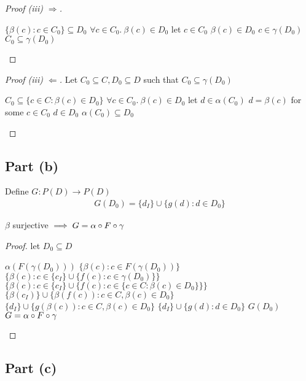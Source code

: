 \begin{prop}
\begin{proof}[Proof (iii) $\Rightarrow$]
    \begin{itemize}
      \step[\imps] $\{\beta(c) : c\in C_0\}\subseteq D_0$
      \step[\imps] $\forall c\in C_0.~\beta(c)\in D_0$
      \marginnote{($\star$)}
      \step let $c\in C_0$
      \step[\imps] $\beta(c)\in D_0$
      \step[\imps] $c\in\gamma(D_0)$
      \step[\imps]$C_0\subseteq\gamma(D_0)$\qedhere
    \end{itemize}
  \end{proof}
  \begin{proof}[Proof (iii) $\Leftarrow$]
    Let $C_0\subseteq C, D_0\subseteq D$ such that $C_0\subseteq\gamma(D_0)$
    \begin{itemize}
      \step[\imps] $C_0\subseteq\{c\in C : \beta(c)\in D_0\}$
      \step[\imps] $\forall c\in C_0.~\beta(c)\in D_0$
      \marginnote{($\star$)}
      \step let $d\in \alpha(C_0)$
      \step[\imps] $d = \beta(c)$ for some $c\in C_0$
      \step[\imps] $d\in D_0$
      \step[\imps]$\alpha(C_0)\subseteq D_0$\qedhere
    \end{itemize}
  \end{proof}
\end{prop}

\subsection{Part (b)}\label{sec:q-2-b}
Define $G : P(D)\to P(D)$
\begin{align*}
  G(D_0) = \{d_I\}\cup\{g(d) : d\in D_0\}
\end{align*}
\begin{prop}
  $\beta$ surjective $\implies G = \alpha\circ F\circ\gamma$
  \begin{proof}
    let $D_0\subseteq D$
    \begin{itemize}
      \step $\alpha(F(\gamma(D_0)))$
      \step[=] $\{\beta(c):c\in F(\gamma(D_0))\}$
      \step[=] $\{\beta(c):c\in \{c_I\}\cup\{f(c):c\in\gamma(D_0)\}\}$
      \step[=] $\{\beta(c):c\in \{c_I\}\cup\{f(c):c\in\{c\in C:\beta(c)\in D_0\}\}\}$
      \step[=] $\{\beta(c_I)\}\cup\{\beta(f(c)) : c\in C,\beta(c)\in D_0\}$
      \step[=] $\{d_I\}\cup\{g(\beta(c)) : c\in C,\beta(c)\in D_0\}$
      \step[=] $\{d_I\}\cup\{g(d):d\in D_0\}$
      \step[=] $G(D_0)$
      \step[\imps] $G = \alpha\circ F\circ\gamma$\qedhere
    \end{itemize}
  \end{proof}
\end{prop}

\subsection{Part (c)}\label{sec:q-2-c}
